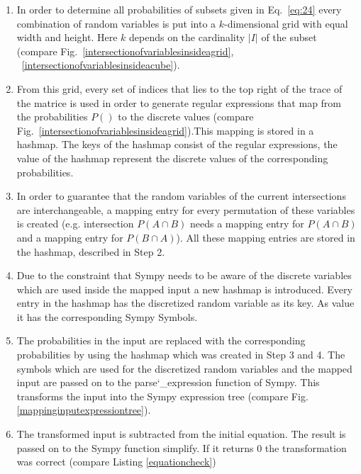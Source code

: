         \begin{enumerate}
            \item In order to determine all probabilities of subsets given in Eq.~\eqref{eq:24} every combination of random variables is put into a $k$-dimensional grid with equal width and height. Here $k$ depends
            on the cardinality $|I|$ of the subset (compare Fig.~\ref{intersectionofvariablesinsideagrid}, ~\ref{intersectionofvariablesinsideacube}).
            \item From this grid, every set of indices that lies to the top right of the trace of the matrice is used in order to generate regular expressions that map from the probabilities $P()$ to the discrete values (compare Fig.~\ref{intersectionofvariablesinsideagrid}).This
            mapping is stored in a hashmap. The keys of the hashmap consist of the regular expressions, the value of the hashmap represent the discrete values of the corresponding probabilities.
            \item In order to guarantee that the random variables of the current intersections are interchangeable, a mapping entry for every permutation of these variables is created (e.g. intersection $P(A \cap B)$ needs a mapping entry for $P(A \cap B)$ and a mapping entry for
            $P(B \cap A)$). All these mapping entries are stored in the hashmap, described in Step 2.
            \item Due to the constraint that Sympy needs to be aware of the discrete variables which are used inside the mapped input a new hashmap is introduced. Every entry in the
            hashmap has the discretized random variable as its key. As value it has the corresponding Sympy Symbols.
            \item The probabilities in the input are replaced with the corresponding probabilities by using the hashmap which was created in Step 3 and 4. The symbols which are used for the discretized random variables and the mapped input are passed
            on to the parse\char`_expression function of Sympy. This transforms the input into the Sympy expression tree (compare Fig.\ref{mappinginputexpressiontree}).
            \item The transformed input is subtracted from the initial equation. The result is passed on to the Sympy function simplify. If it returns 0 the transformation was
            correct (compare Listing \ref{equationcheck})
        \end{enumerate}
